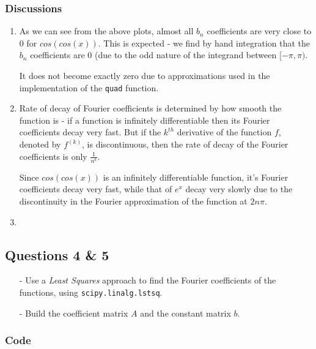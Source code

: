 \documentclass[11pt, a4paper, twoside]{article}
\begin{document}
            \subsubsection{Discussions}
                \begin{enumerate}[label=(\alph*)]
                    \item As we can see from the above plots, almost all $b_n$ coefficients are very close to 0 for $cos(cos(x))$. This is expected - we find by hand integration that the $b_n$ coefficients are 0 (due to the odd nature of the integrand between $[-\pi,\pi)$.

                    It does not become exactly zero due to approximations used in the implementation of the \texttt{quad} function.

                    \item Rate of decay of Fourier coefficients is determined by how smooth the  function is - if a function is infinitely differentiable then its Fourier coefficients decay very fast. But if the $k^{th}$ derivative of the function $f$, denoted by $f^{(k)}$, is discontinuous, then the rate of decay of the Fourier coefficients is only $\frac{1}{n^k}$.

                    Since $cos(cos(x))$ is an infinitely differentiable function, it's Fourier coefficients decay very fast, while that of $e^x$ decay very slowly due to the discontinuity in the Fourier approximation of the function at $2n\pi$.

                    \item
                \end{enumerate}
        \subsection{Questions 4 \& 5}
            \begin{itemize}
                \item[-] Use a \textit{Least Squares} approach to find the Fourier coefficients of the functions, using \texttt{scipy.linalg.lstsq}.
                \item[-] Build the coefficient matrix $A$ and the constant matrix $b$.
            \end{itemize}

            \subsubsection{Code}
                \inputminted[linenos, breaklines]{python}{Code/q4.py}
\end{document}
